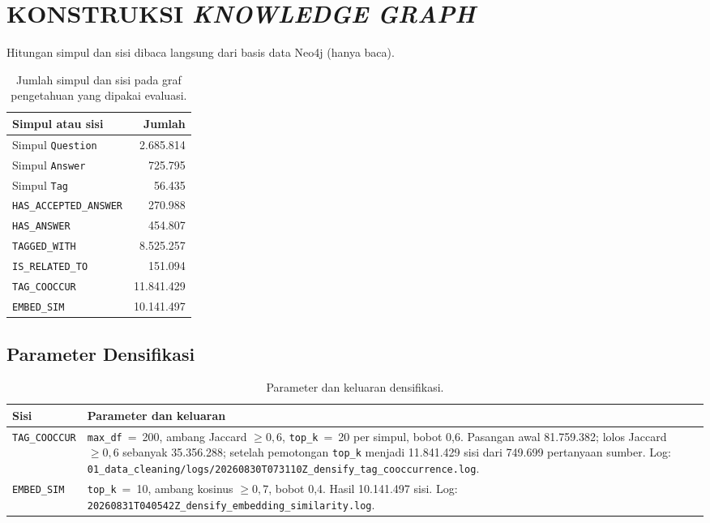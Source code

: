 \cleardoublepage
\chapter{KONSTRUKSI \textit{KNOWLEDGE GRAPH}}
\label{lamp:kg}

Hitungan simpul dan sisi dibaca langsung dari basis data Neo4j (hanya baca).

\begin{table}[!htbp]
\centering
\small
\caption{Jumlah simpul dan sisi pada graf pengetahuan yang dipakai evaluasi.}
\label{tab:lamp-kg}
\renewcommand{\arraystretch}{1.2}
\begin{tabular}{|l|r|}
\hline
\textbf{Simpul atau sisi} & \textbf{Jumlah} \\
\hline
Simpul \texttt{Question} & 2.685.814 \\
Simpul \texttt{Answer} & 725.795 \\
Simpul \texttt{Tag} & 56.435 \\
\hline
\texttt{HAS\_\allowbreak{}ACCEPTED\_\allowbreak{}ANSWER} & 270.988 \\
\texttt{HAS\_ANSWER} & 454.807 \\
\texttt{TAGGED\_WITH} & 8.525.257 \\
\texttt{IS\_\allowbreak{}RELATED\_\allowbreak{}TO} & 151.094 \\
\texttt{TAG\_COOCCUR} & 11.841.429 \\
\texttt{EMBED\_SIM} & 10.141.497 \\
\hline
\end{tabular}
\end{table}

\section{Parameter Densifikasi}
\label{sec:lamp-kg-densifikasi}

\begin{table}[!htbp]
\centering
\small
\caption{Parameter dan keluaran densifikasi.}
\label{tab:lamp-densifikasi}
\renewcommand{\arraystretch}{1.2}
\begin{tabularx}{\textwidth}{|>{\raggedright\arraybackslash}p{2.6cm}|>{\raggedright\arraybackslash}X|}
\hline
\textbf{Sisi} & \textbf{Parameter dan keluaran} \\
\hline
\texttt{TAG\_COOCCUR} & \texttt{max\_df}~=~200, ambang Jaccard $\geq 0{,}6$, \texttt{top\_k}~=~20 per simpul, bobot 0,6. Pasangan awal 81.759.382; lolos Jaccard $\geq 0{,}6$ sebanyak 35.356.288; setelah pemotongan \texttt{top\_k} menjadi 11.841.429 sisi dari 749.699 pertanyaan sumber. Log: \texttt{01\_\allowbreak{}data\_\allowbreak{}cleaning/\allowbreak{}logs/\allowbreak{}20260830T073110Z\_\allowbreak{}densify\_\allowbreak{}tag\_\allowbreak{}cooccurrence.\allowbreak{}log}. \\
\hline
\texttt{EMBED\_SIM} & \texttt{top\_k}~=~10, ambang kosinus $\geq 0{,}7$, bobot 0,4. Hasil 10.141.497 sisi. Log: \texttt{20260831T040542Z\_\allowbreak{}densify\_\allowbreak{}embedding\_\allowbreak{}similarity.\allowbreak{}log}. \\
\hline
\end{tabularx}
\end{table}

